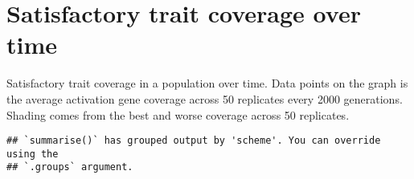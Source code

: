 \documentclass[]{book}
\newenvironment{Shaded}{\begin{snugshade}}{\end{snugshade}}
\newcommand{\DataTypeTok}[1]{\textcolor[rgb]{0.13,0.29,0.53}{#1}}
\newcommand{\KeywordTok}[1]{\textcolor[rgb]{0.13,0.29,0.53}{\textbf{#1}}}
\newcommand{\NormalTok}[1]{#1}
\newcommand{\OperatorTok}[1]{\textcolor[rgb]{0.81,0.36,0.00}{\textbf{#1}}}
\newcommand{\StringTok}[1]{\textcolor[rgb]{0.31,0.60,0.02}{#1}}
\begin{document}
\hypertarget{satisfactory-trait-coverage-over-time}{%
\section{Satisfactory trait coverage over time}\label{satisfactory-trait-coverage-over-time}}

Satisfactory trait coverage in a population over time.
Data points on the graph is the average activation gene coverage across 50 replicates every 2000 generations.
Shading comes from the best and worse coverage across 50 replicates.

\begin{Shaded}
\end{Shaded}

\begin{verbatim}
## `summarise()` has grouped output by 'scheme'. You can override using the
## `.groups` argument.
\end{verbatim}
\end{document}
